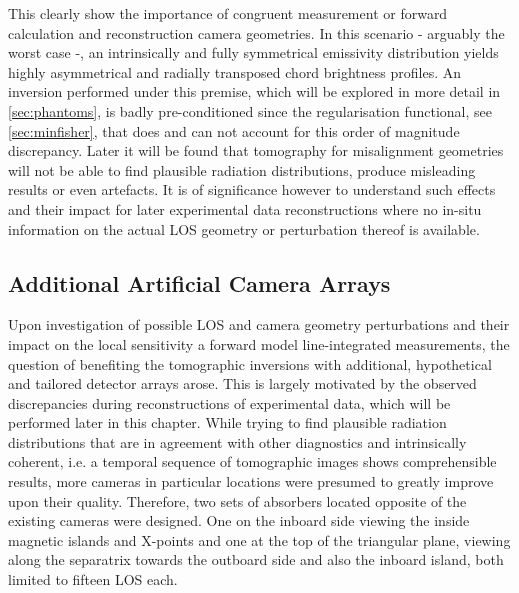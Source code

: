             This clearly show the importance of congruent measurement or forward calculation and reconstruction camera geometries. In this scenario - arguably the worst case -, an intrinsically and fully symmetrical emissivity distribution yields highly asymmetrical and radially transposed chord brightness profiles. An inversion performed under this premise, which will be explored in more detail in \cref{sec:phantoms}, is badly pre-conditioned since the regularisation functional, see \cref{sec:minfisher}, that does and can not account for this order of magnitude discrepancy. Later it will be found that tomography for misalignment geometries will not be able to find plausible radiation distributions, produce misleading results or even artefacts. It is of significance however to understand such effects and their impact for later experimental data reconstructions where no in-situ information on the actual LOS geometry or perturbation thereof is available.%
%
        \subsection{Additional Artificial Camera Arrays}\label{subsec:artf}%
%
           Upon investigation of possible LOS and camera geometry perturbations and their impact on the local sensitivity a forward model line-integrated measurements, the question of benefiting the tomographic inversions with additional, hypothetical and tailored detector arrays arose. This is largely motivated by the observed discrepancies during reconstructions of experimental data, which will be performed later in this chapter. While trying to find plausible radiation distributions that are in agreement with other diagnostics and intrinsically coherent, i.e. a temporal sequence of tomographic images shows comprehensible results, more cameras in particular locations were presumed to greatly improve upon their quality. Therefore, two sets of absorbers located opposite of the existing cameras were designed. One on the inboard side viewing the inside magnetic islands and X-points and one at the top of the triangular plane, viewing along the separatrix towards the outboard side and also the inboard island, both limited to fifteen LOS each.%
%
